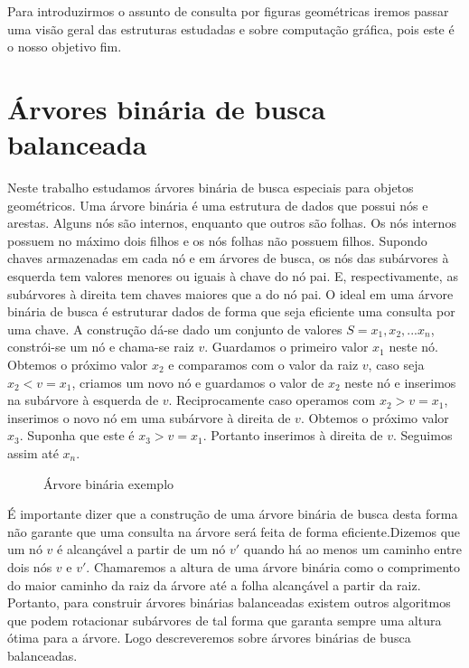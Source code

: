 Para introduzirmos o assunto de consulta por figuras geométricas iremos passar uma visão geral das estruturas estudadas e sobre computação gráfica, pois este é o nosso objetivo fim.

\section{Árvores binária de busca balanceada}
Neste trabalho estudamos árvores binária de busca especiais para objetos geométricos. Uma árvore binária é uma estrutura de dados que possui nós e arestas. Alguns nós são internos, enquanto que outros são folhas. Os nós internos possuem no máximo dois filhos e os nós folhas não possuem filhos. Supondo chaves armazenadas em cada nó e em árvores de busca, os nós das subárvores à esquerda tem valores menores ou iguais à chave do nó pai. E, respectivamente, as subárvores à direita tem chaves maiores que a do nó pai. O ideal em uma árvore binária de busca é estruturar dados de forma que seja eficiente uma consulta por uma chave. A construção dá-se dado um conjunto de valores $S = {x_1, x_2, ... x_n}$, constrói-se um nó e chama-se raiz $v$. Guardamos o primeiro valor $x_1$ neste nó. Obtemos o próximo valor $x_2$ e comparamos com o valor da raiz $v$, caso seja $x_2 < v = x_1$, criamos um novo nó e guardamos o valor de $x_2$ neste nó e inserimos na subárvore à esquerda de $v$. Reciprocamente caso operamos com $x_2 > v = x_1$, inserimos o novo nó em uma subárvore à direita de $v$. Obtemos o próximo valor $x_3$. Suponha que este é $x_3 > v = x_1$. Portanto inserimos à direita de $v$. Seguimos assim até $x_n$. 

\begin{figure}[h]
\centering
{}
\caption{Árvore binária exemplo}
\label{fig:14}
\end{figure}

É importante dizer que a construção de uma árvore binária de busca desta forma não garante que uma consulta na árvore será feita de forma eficiente.Dizemos que um nó $v$ é alcançável a partir de um nó $v'$ quando há ao menos um caminho entre dois nós $v$ e $v'$. Chamaremos a altura de uma árvore binária como o comprimento do maior caminho da raiz da árvore até a folha alcançável a partir da raiz.  Portanto, para construir árvores binárias balanceadas existem outros algoritmos que podem rotacionar subárvores de tal forma que garanta sempre uma altura ótima para a árvore.  Logo descreveremos sobre árvores binárias de busca balanceadas.

